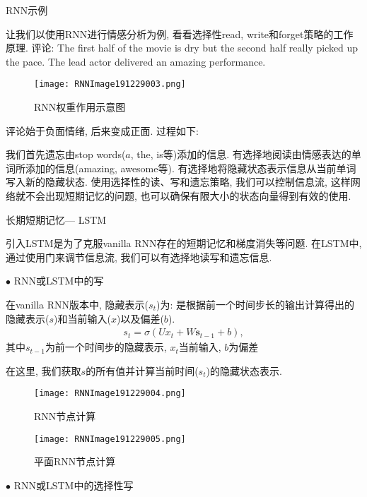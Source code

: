 \begin{example}RNN示例

让我们以使用RNN进行情感分析为例, 看看选择性read, write和forget策略的工作原理.
评论: The first half of the movie is dry but the second half really picked up the pace. The lead actor delivered an amazing performance.
\begin{figure}[H]
\centering
\texttt{[image: RNNImage191229003.png]}
\caption{RNN权重作用示意图}
\label{RNNImage191229003}\vspace{-0.4cm}
\end{figure}
评论始于负面情绪, 后来变成正面. 过程如下:

我们首先遗忘由stop words($a$, the, is等)添加的信息. 有选择地阅读由情感表达的单词所添加的信息(amazing, awesome等). 有选择地将隐藏状态表示信息从当前单词写入新的隐藏状态.
使用选择性的读、写和遗忘策略, 我们可以控制信息流, 这样网络就不会出现短期记忆的问题, 也可以确保有限大小的状态向量得到有效的使用.

长期短期记忆— LSTM

引入LSTM是为了克服vanilla RNN存在的短期记忆和梯度消失等问题. 在LSTM中, 通过使用门来调节信息流, 我们可以有选择地读写和遗忘信息.

$\bullet$ RNN或LSTM中的写

在vanilla RNN版本中, 隐藏表示($s_t$)为: 是根据前一个时间步长的输出计算得出的隐藏表示($s$)和当前输入($x$)以及偏差($b$).
\begin{align}
  s_{t}=\sigma\left(U x_{t}+W \mathbf{s}_{t-1}+b\right),
\end{align}
其中$s_{t-1}$为前一个时间步的隐藏表示, $x_t$当前输入, $b$为偏差

在这里, 我们获取$s$的所有值并计算当前时间($s_t$)的隐藏状态表示.
\begin{figure}[H]
\centering
\texttt{[image: RNNImage191229004.png]}
\caption{RNN节点计算}
\label{RNNImage191229004}\vspace{-0.4cm}
\end{figure}
\begin{figure}[H]
\centering
\texttt{[image: RNNImage191229005.png]}
\caption{平面RNN节点计算}
\label{RNNImage191229005}\vspace{-0.4cm}
\end{figure}

$\bullet$ RNN或LSTM中的选择性写


\end{example}
